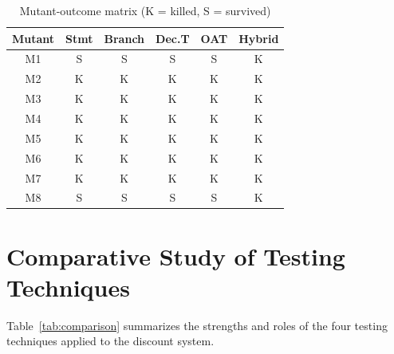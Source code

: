 \documentclass[conference]{IEEEtran}
\begin{document}
\begin{table}[!t]

\centering

\caption{Mutant-outcome matrix (K = killed, S = survived)}

\label{tab:mutant_matrix}

\begin{tabular}{|c|c|c|c|c|c|}
\hline
\textbf{Mutant} & \textbf{Stmt} & \textbf{Branch} & \textbf{Dec.T} & \textbf{OAT} & \textbf{Hybrid} \\
\hline
M1 & S & S & S & S & K \\
M2 & K & K & K & K & K \\
M3 & K & K & K & K & K \\
M4 & K & K & K & K & K \\
M5 & K & K & K & K & K \\
M6 & K & K & K & K & K \\
M7 & K & K & K & K & K \\
M8 & S & S & S & S & K \\
\hline
\end{tabular}

\end{table}






\section{Comparative Study of Testing Techniques}

\label{sec:comparison}



Table~\ref{tab:comparison} summarizes the strengths and roles of the four testing techniques applied to the discount system.
\end{document}
